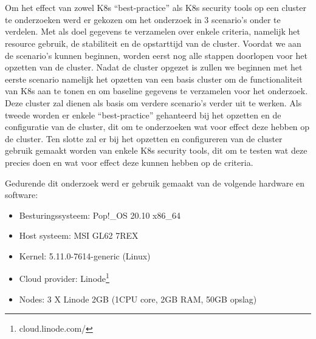 
\chapter{}
\label{ch:methodologie}

Om het effect van zowel K8s ``best-practice'' als K8s security tools op een cluster te onderzoeken werd er gekozen om het onderzoek in 3 scenario's onder te verdelen. Met als doel gegevens te verzamelen over enkele criteria, namelijk het resource gebruik, de stabiliteit en de opstarttijd van de cluster. Voordat we aan de scenario's kunnen beginnen, worden eerst nog alle stappen doorlopen voor het opzetten van de cluster. Nadat de cluster opgezet is zullen we beginnen met het eerste scenario namelijk het opzetten van een basis cluster om de functionaliteit van K8s aan te tonen en om baseline gegevens te verzamelen voor het onderzoek. Deze cluster zal dienen als basis om verdere scenario's verder uit te werken. Als tweede worden er enkele ``best-practice'' gehanteerd bij het opzetten en de configuratie van de cluster, dit om te onderzoeken wat voor effect deze hebben op de cluster. Ten slotte zal er bij het opzetten en configureren van de cluster gebruik gemaakt worden van enkele K8s security tools, dit om te testen wat deze precies doen en wat voor effect deze kunnen hebben op de criteria. 

Gedurende dit onderzoek werd er gebruik gemaakt van de volgende hardware en software:

\begin{itemize}
	\item Besturingssysteem: Pop!\_OS 20.10 x86\_64
	\item Host systeem: MSI GL62 7REX
	\item Kernel: 5.11.0-7614-generic (Linux)
	\item Cloud provider: Linode\footnote{cloud.linode.com/}
	\item Nodes: 3 X Linode 2GB (1CPU core, 2GB RAM, 50GB opslag)
\end{itemize}

